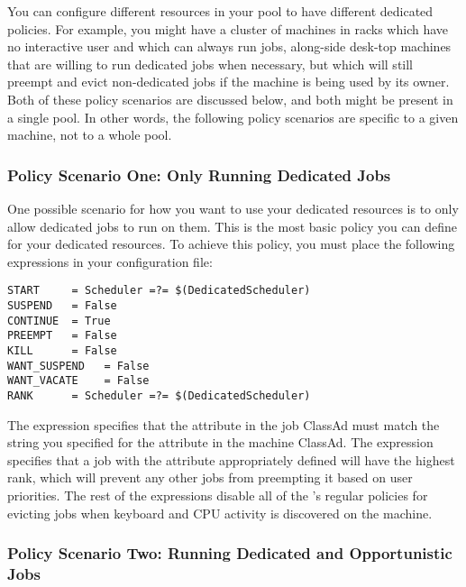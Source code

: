 \Note You can configure different resources in your pool to have
different dedicated policies.
For example, you might have a cluster of machines in racks which have
no interactive user and which can always run jobs, along-side desk-top
machines that are willing to run dedicated jobs when necessary, but
which will still preempt and evict non-dedicated jobs if the machine
is being used by its owner.  
Both of these policy scenarios are discussed below, and both might be
present in a single pool.
In other words, the following policy scenarios are specific to a given
machine, not to a whole pool.


\subsubsection{\label{sec:Configure-Dedicated-Only-Policy}
Policy Scenario One: Only Running Dedicated Jobs}

One possible scenario for how you want to use your dedicated resources
is to only allow dedicated jobs to run on them.  
This is the most basic policy you can define for your dedicated
resources.
To achieve this policy, you must place the following expressions in
your configuration file:

\begin{verbatim}
START     = Scheduler =?= $(DedicatedScheduler)
SUSPEND   = False
CONTINUE  = True
PREEMPT   = False
KILL      = False
WANT_SUSPEND   = False
WANT_VACATE    = False
RANK      = Scheduler =?= $(DedicatedScheduler)
\end{verbatim}

The  expression specifies that the 
attribute in the job ClassAd must match the string you specified for
the  attribute in the machine ClassAd.
The  expression specifies that a job with the
 attribute appropriately defined will have the highest
rank, which will prevent any other jobs from preempting it based on
user priorities.
The rest of the expressions disable all of the 's
regular policies for evicting jobs when keyboard and CPU activity is
discovered on the machine.


\subsubsection{\label{sec:Configure-Dedicated-Opportunistic-Policy}
Policy Scenario Two: Running Dedicated and Opportunistic Jobs}

